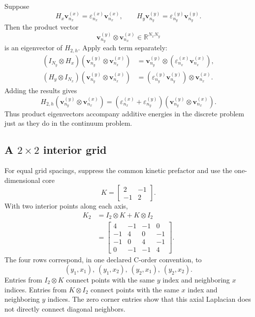Suppose
\begin{equation}
  H_x\mathbf v_{n_x}^{(x)}
  =\varepsilon_{n_x}^{(x)}\mathbf v_{n_x}^{(x)},
  \qquad
  H_y\mathbf v_{n_y}^{(y)}
  =\varepsilon_{n_y}^{(y)}\mathbf v_{n_y}^{(y)}.
\end{equation}
Then the product vector
\begin{equation}
  \mathbf v_{n_y}^{(y)}\otimes\mathbf v_{n_x}^{(x)}
  \in\mathbb R^{N_xN_y}
\end{equation}
is an eigenvector of \(H_{2,h}\). Apply each term separately:
\begin{align}
  (I_{N_y}\otimes H_x)
  (\mathbf v_{n_y}^{(y)}\otimes\mathbf v_{n_x}^{(x)})
  &=\mathbf v_{n_y}^{(y)}\otimes
    (\varepsilon_{n_x}^{(x)}\mathbf v_{n_x}^{(x)}),\\
  (H_y\otimes I_{N_x})
  (\mathbf v_{n_y}^{(y)}\otimes\mathbf v_{n_x}^{(x)})
  &=(\varepsilon_{n_y}^{(y)}\mathbf v_{n_y}^{(y)})
    \otimes\mathbf v_{n_x}^{(x)}.
\end{align}
Adding the results gives
\begin{equation}
  H_{2,h}
  (\mathbf v_{n_y}^{(y)}\otimes\mathbf v_{n_x}^{(x)})
  =
  (\varepsilon_{n_x}^{(x)}+\varepsilon_{n_y}^{(y)})
  (\mathbf v_{n_y}^{(y)}\otimes\mathbf v_{n_x}^{(x)}).
\end{equation}
Thus product eigenvectors accompany additive energies in the discrete problem
just as they do in the continuum problem.

\subsection{A \(2\times2\) interior grid}

For equal grid spacings, suppress the common kinetic prefactor and use the
one-dimensional core
\begin{equation}
  K=
  \begin{bmatrix}
    2 & -1\\
    -1 & 2
  \end{bmatrix}.
\end{equation}
With two interior points along each axis,
\begin{align}
  K_2
  &=I_2\otimes K+K\otimes I_2\\
  &=
  \begin{bmatrix}
    4 & -1 & -1 & 0\\
    -1 & 4 & 0 & -1\\
    -1 & 0 & 4 & -1\\
    0 & -1 & -1 & 4
  \end{bmatrix}.
\end{align}
The four rows correspond, in one declared C-order convention, to
\begin{equation}
  (y_1,x_1),\ (y_1,x_2),\ (y_2,x_1),\ (y_2,x_2).
\end{equation}
Entries from \(I_2\otimes K\) connect points with the same \(y\) index and
neighboring \(x\) indices. Entries from \(K\otimes I_2\) connect points with
the same \(x\) index and neighboring \(y\) indices. The zero corner entries
show that this axial Laplacian does not directly connect diagonal neighbors.

